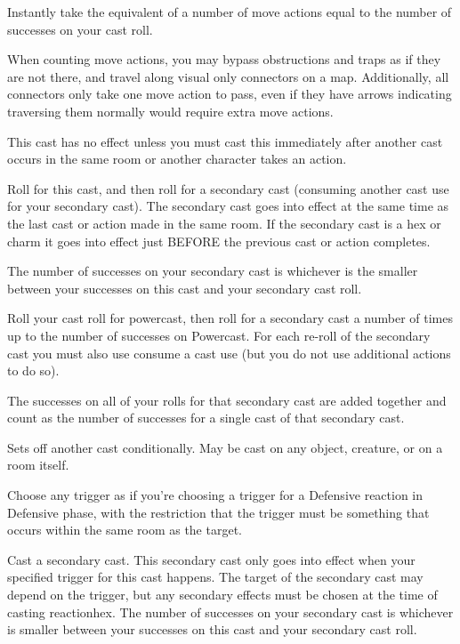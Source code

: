 \begin{GRPtablewide}
{		Instantly take the equivalent of a number of move actions equal to the number of successes on your cast roll.

		When counting move actions, you may bypass obstructions and traps as if they are not there, and travel along visual only connectors on a map. Additionally, all connectors only take one move action to pass, even if they have arrows indicating traversing them normally would require extra move actions.
	}

	{%
		This cast has no effect unless you must cast this immediately after another cast occurs in the same room or another character takes an action.

		Roll for this cast, and then roll for a secondary cast (consuming another cast use for your secondary cast). The secondary cast goes into effect at the same time as the last cast or action made in the same room. If the secondary cast is a hex or charm it goes into effect just BEFORE the previous cast or action completes.

		The number of successes on your secondary cast is whichever is the smaller between your successes on this cast and your secondary cast roll.
	}

	{%
		Roll your cast roll for powercast, then roll for a secondary cast a number of times up to the number of successes on Powercast. For each re-roll of the secondary cast you must also use consume a cast use (but you do not use additional actions to do so).

		The successes on all of your rolls for that secondary cast are added together and count as the number of successes for a single cast of that secondary cast.
	}

	{%
		Sets off another cast conditionally. May be cast on any object, creature, or on a room itself.

		Choose any trigger as if you're choosing a trigger for a Defensive reaction in Defensive phase, with the restriction that the trigger must be something that occurs within the same room as the target.

		Cast a secondary cast. This secondary cast only goes into effect when your specified trigger for this cast happens. The target of the secondary cast may depend on the trigger, but any secondary effects must be chosen at the time of casting reactionhex. The number of successes on your secondary cast is whichever is smaller between your successes on this cast and your secondary cast roll.

}
\end{GRPtablewide}

